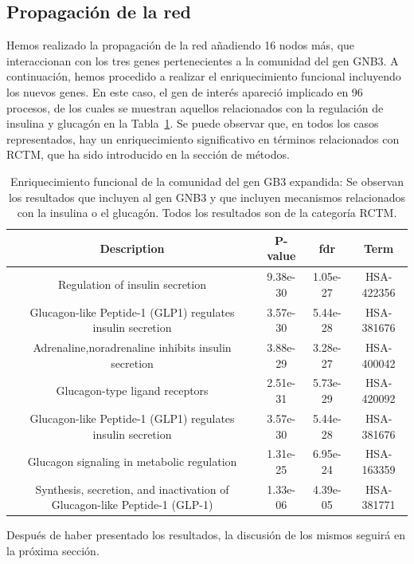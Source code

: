 \subsection{Propagación de la red}

Hemos realizado la propagación de la red añadiendo 16 nodos más, que interaccionan con los tres genes pertenecientes a la comunidad del gen GNB3. A continuación, hemos procedido a realizar el enriquecimiento funcional incluyendo los nuevos genes. En este caso, el gen de interés apareció implicado en 96 procesos, de los cuales se muestran aquellos relacionados con la regulación de insulina y glucagón en la Tabla~\ref{table:enriquecimiento2}. Se puede observar que, en todos los casos representados, hay un enriquecimiento significativo en términos relacionados con RCTM, que ha sido introducido en la sección de métodos.


\begin{table}[h]
	\centering
	\caption{Enriquecimiento funcional de la comunidad del gen GB3 expandida: Se observan los resultados que incluyen al gen GNB3 y que incluyen mecanismos relacionados con la insulina o el glucagón. Todos los resultados son de la categoría RCTM.}
	\label{table:enriquecimiento2}
	\begin{tabular}{|c|c|c|c|}
		\hline
		 \textbf{Description} & \textbf{P-value} &\textbf{ fdr }&  \textbf{Term} \\ \hline
		 Regulation of insulin secretion   & 9.38e-30 & 1.05e-27 &   HSA-422356 \\ \hline
		 Glucagon-like Peptide-1 (GLP1) regulates insulin secretion  & 3.57e-30 & 5.44e-28  & HSA-381676 \\ \hline
		 Adrenaline,noradrenaline inhibits insulin secretion & 3.88e-29 & 3.28e-27  & HSA-400042 \\ \hline
		 Glucagon-type ligand receptors & 2.51e-31 & 5.73e-29  & HSA-420092 \\ \hline
		 Glucagon-like Peptide-1 (GLP1) regulates insulin secretion & 3.57e-30 & 5.44e-28  & HSA-381676 \\ \hline
		 Glucagon signaling in metabolic regulation & 1.31e-25 & 6.95e-24  & HSA-163359 \\ \hline
		 Synthesis, secretion, and inactivation of Glucagon-like Peptide-1 (GLP-1) & 1.33e-06 & 4.39e-05  & HSA-381771 \\ \hline
	\end{tabular}

\end{table}

Después de haber presentado los resultados, la discusión de los mismos seguirá en la próxima sección.
